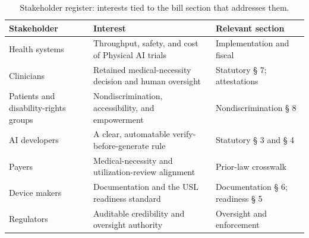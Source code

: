\begin{table}[ht]
\centering
\begin{tabularx}{\textwidth}{L{3.4cm} Y L{3.0cm}}
\toprule
\textbf{Stakeholder} & \textbf{Interest} & \textbf{Relevant section} \\
\midrule
Health systems & Throughput, safety, and cost of Physical AI trials & Implementation and fiscal \\
Clinicians & Retained medical-necessity decision and human oversight & Statutory § 7; attestations \\
Patients and disability-rights groups & Nondiscrimination, accessibility, and empowerment \cite{usc-ada, usc-titlevi} & Nondiscrimination § 8 \\
AI developers & A clear, automatable verify-before-generate rule & Statutory § 3 and § 4 \\
Payers & Medical-necessity and utilization-review alignment & Prior-law crosswalk \\
Device makers & Documentation and the USL readiness standard & Documentation § 6; readiness § 5 \\
Regulators & Auditable credibility and oversight authority & Oversight and enforcement \\
\bottomrule
\end{tabularx}
\caption{Stakeholder register: interests tied to the bill section that addresses them.}
\label{tab:stakeholders}
\end{table}
